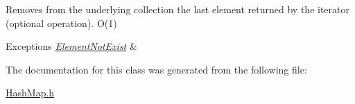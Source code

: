 \label{class_hash_map_1_1_iterator_af0f58ac5800876fddce601e5c6e6dd11}
Removes from the underlying collection the last element returned by the iterator (optional operation). O(1) 
\begin{DoxyExceptions}{Exceptions}
{\em \hyperlink{class_element_not_exist}{ElementNotExist}} & \\
\hline
\end{DoxyExceptions}


The documentation for this class was generated from the following file:\begin{DoxyCompactItemize}
\item 
\hyperlink{_hash_map_8h}{HashMap.h}\end{DoxyCompactItemize}
